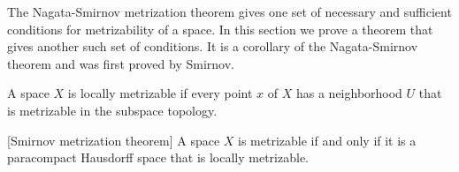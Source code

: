 The Nagata-Smirnov metrization theorem gives one set of necessary and sufficient conditions for metrizability of a space. In this section we prove a theorem that gives another such set of conditions. It is a corollary of the Nagata-Smirnov theorem and was first proved by Smirnov.

\begin{definition}
A space \(X\) is locally metrizable if every point \(x\) of \(X\) has a neighborhood \(U\) that is metrizable in the subspace topology.
\end{definition}

\begin{theorem}
\label{thm:\thetheorem}[Smirnov metrization theorem]
A space \(X\) is metrizable if and only if it is a paracompact Hausdorff space that is locally metrizable.
\end{theorem}

